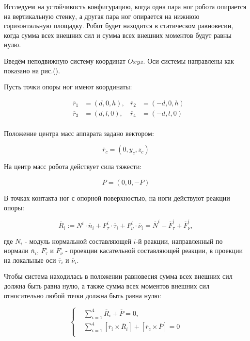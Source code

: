 Исследуем на устойчивость конфигурацию, когда одна пара ног робота опирается на вертикальную стенку, а другая пара ног опирается на нижнюю горизонтальную площадку. Робот будет находится в статическом равновесии, когда сумма всех внешних сил и сумма всех внешних моментов будут равны нулю.

Введём неподвижную систему координат $Oxyz$. Оси системы направлены как показано на рис.().

Пусть точки опоры ног имеют координаты:

\begin{equation}
  \label{eq:step_points}
  \begin{alignedat}{3}
    &\overline{r}_1 &= (d, 0, h) , &\overline{r}_2 &= (-d, 0, h) \\
    &\overline{r}_3 &= (d, l, 0) , &\overline{r}_4 &= (-d, l, 0) \\
  \end{alignedat}
\end{equation}


Положение центра масс аппарата задано вектором:

\[\overline{r}_c = (0, y_c, z_c)\]

На центр масс робота действует сила тяжести:

\begin{equation}
\label{eq:F_c}
  \overline{P} = (0,0,-P)
\end{equation}

В точках контакта ног с опорной поверхностью, на ноги действуют реакции опоры:

\begin{equation}
\label{eq:reactions}
  \overline{R}_i := N^i\cdot\overline{n}_i + F_\tau^i\cdot\overline{\tau}_i + F_\nu^i\cdot\overline{\nu}_i = \overline{N}^i + \overline{F}_\tau^i + \overline{F}_\nu^i,
\end{equation}

где $N_i$ - модуль нормальной составляющей $i$-й реакции, направленный по нормали $\overline{n}_i$, $F_\tau^i$ и $F_\nu^i$ - проекции касательной составляющей реакции, в проекции на локальные оси $\overline{\tau}_i$ и $\overline{\nu}_i$.

Чтобы система находилась в положении равновесия сумма всех внешних сил должна быть равна нулю, а также сумма всех моментов внешних сил относительно любой точки должна быть равна нулю:

\begin{equation}
\label{eq:general_static_equations}
  \left\{
    \begin{alignedat}{3}
      &\sum_{i=1}^4\overline{R}_i+\overline{P} = 0, \\
      &\sum_{i=1}^4[\overline{r}_i\times\overline{R}_i] + [\overline{r}_c\times\overline{P}] = 0\\
    \end{alignedat}
  \right.
\end{equation}



